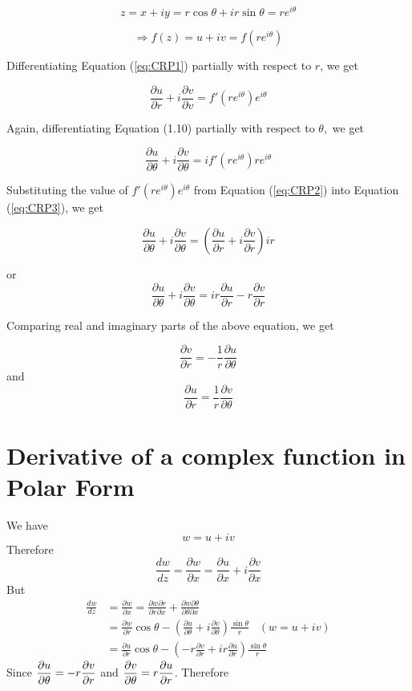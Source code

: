 \[
z=x+iy=r\cos\theta+ir\sin\theta=re^{i\theta}\]


\begin{equation}
\Rightarrow f(z)=u+iv=f(re^{i\theta})\label{eq:CRP1}\end{equation}


Differentiating Equation (\ref{eq:CRP1}) partially with respect to
$r$, we get 

\begin{equation}
\frac{\partial u}{\partial r}+i\frac{\partial v}{\partial v}=f'(re^{i\theta})e^{i\theta}\label{eq:CRP2}\end{equation}


Again, differentiating Equation (1.10) partially with respect to $\theta,$
we get 

\begin{equation}
\frac{\partial u}{\partial\theta}+i\frac{\partial v}{\partial\theta}=if'(re^{i\theta})re^{i\theta}\label{eq:CRP3}\end{equation}


Substituting the value of $f'(re^{i\theta})e^{i\theta}$ from Equation
(\ref{eq:CRP2}) into Equation (\ref{eq:CRP3}), we get 

\[
\frac{\partial u}{\partial\theta}+i\frac{\partial v}{\partial\theta}=\left(\frac{\partial u}{\partial r}+i\frac{\partial v}{\partial r}\right)ir\]


or \[
\frac{\partial u}{\partial\theta}+i\frac{\partial v}{\partial\theta}=ir\frac{\partial u}{\partial r}-r\frac{\partial v}{\partial r}\]


Comparing real and imaginary parts of the above equation, we get

\begin{equation}
\frac{\partial v}{\partial r}=-\frac{1}{r}\frac{\partial u}{\partial\theta}\label{eq:CRPa}\end{equation}
 and \begin{equation}
\frac{\partial u}{\partial r}=\frac{1}{r}\frac{\partial v}{\partial\theta}\label{eq:CRPb}\end{equation}

\section{Derivative of a complex function in Polar Form}
We have \[w=u+iv\]
Therefore 
\[\frac{dw}{dz}=\frac{\partial w}{\partial x}=\frac{\partial u}{\partial x}+i\frac{\partial v}{\partial x}\]
But \begin{align*}
\frac{dw}{dz} & =\frac{\partial w}{\partial x}=\frac{\partial w\partial r}{\partial r\partial x}+\frac{\partial w\partial\theta}{\partial\theta\partial x}\\
 & =\frac{\partial w}{\partial r}\cos\theta-\left(\frac{\partial u}{\partial\theta}+i\frac{\partial v}{\partial\theta}\right)\frac{\sin\theta}{r}\;\;\;(w=u+iv)\\
 & =\frac{\partial u}{\partial r}\cos\theta-\left(-r\frac{\partial v}{\partial r}+ir\frac{\partial u}{\partial r}\right)\frac{\sin\theta}{r}\end{align*}
Since $\displaystyle \frac{\partial u}{\partial\theta}=-r\frac{\partial v}{\partial r}$
and $\displaystyle \frac{\partial v}{\partial\theta}=r\frac{\partial u}{\partial r}$.
Therefore 

